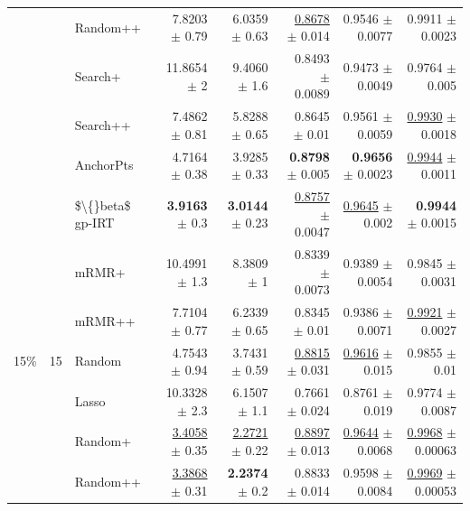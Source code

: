 \begin{longtable}{llp{}rrrrr}
 &  & Random++ & 7.8203 {\scriptsize $\pm$ 0.79} & 6.0359 {\scriptsize $\pm$ 0.63} & \underline{0.8678} {\scriptsize $\pm$ 0.014} & 0.9546 {\scriptsize $\pm$ 0.0077} & 0.9911 {\scriptsize $\pm$ 0.0023} \\
 &  & Search+ & 11.8654 {\scriptsize $\pm$ 2} & 9.4060 {\scriptsize $\pm$ 1.6} & 0.8493 {\scriptsize $\pm$ 0.0089} & 0.9473 {\scriptsize $\pm$ 0.0049} & 0.9764 {\scriptsize $\pm$ 0.005} \\
 &  & Search++ & 7.4862 {\scriptsize $\pm$ 0.81} & 5.8288 {\scriptsize $\pm$ 0.65} & 0.8645 {\scriptsize $\pm$ 0.01} & 0.9561 {\scriptsize $\pm$ 0.0059} & \underline{0.9930} {\scriptsize $\pm$ 0.0018} \\
 &  & AnchorPts & 4.7164 {\scriptsize $\pm$ 0.38} & 3.9285 {\scriptsize $\pm$ 0.33} & \textbf{0.8798} {\scriptsize $\pm$ 0.005} & \textbf{0.9656} {\scriptsize $\pm$ 0.0023} & \underline{0.9944} {\scriptsize $\pm$ 0.0011} \\
 &  & \$\textbackslash\{\}beta\$ gp-IRT & \textbf{3.9163} {\scriptsize $\pm$ 0.3} & \textbf{3.0144} {\scriptsize $\pm$ 0.23} & \underline{0.8757} {\scriptsize $\pm$ 0.0047} & \underline{0.9645} {\scriptsize $\pm$ 0.002} & \textbf{0.9944} {\scriptsize $\pm$ 0.0015} \\
 &  & mRMR+ & 10.4991 {\scriptsize $\pm$ 1.3} & 8.3809 {\scriptsize $\pm$ 1} & 0.8339 {\scriptsize $\pm$ 0.0073} & 0.9389 {\scriptsize $\pm$ 0.0054} & 0.9845 {\scriptsize $\pm$ 0.0031} \\
 &  & mRMR++ & 7.7104 {\scriptsize $\pm$ 0.77} & 6.2339 {\scriptsize $\pm$ 0.65} & 0.8345 {\scriptsize $\pm$ 0.01} & 0.9386 {\scriptsize $\pm$ 0.0071} & \underline{0.9921} {\scriptsize $\pm$ 0.0027} \\
\midrule
15\% & 15 & Random & 4.7543 {\scriptsize $\pm$ 0.94} & 3.7431 {\scriptsize $\pm$ 0.59} & \underline{0.8815} {\scriptsize $\pm$ 0.031} & \underline{0.9616} {\scriptsize $\pm$ 0.015} & 0.9855 {\scriptsize $\pm$ 0.01} \\
 &  & Lasso & 10.3328 {\scriptsize $\pm$ 2.3} & 6.1507 {\scriptsize $\pm$ 1.1} & 0.7661 {\scriptsize $\pm$ 0.024} & 0.8761 {\scriptsize $\pm$ 0.019} & 0.9774 {\scriptsize $\pm$ 0.0087} \\
 &  & Random+ & \underline{3.4058} {\scriptsize $\pm$ 0.35} & \underline{2.2721} {\scriptsize $\pm$ 0.22} & \underline{0.8897} {\scriptsize $\pm$ 0.013} & \underline{0.9644} {\scriptsize $\pm$ 0.0068} & \underline{0.9968} {\scriptsize $\pm$ 0.00063} \\
 &  & Random++ & \underline{3.3868} {\scriptsize $\pm$ 0.31} & \textbf{2.2374} {\scriptsize $\pm$ 0.2} & 0.8833 {\scriptsize $\pm$ 0.014} & 0.9598 {\scriptsize $\pm$ 0.0084} & \underline{0.9969} {\scriptsize $\pm$ 0.00053} \\

\end{longtable}
